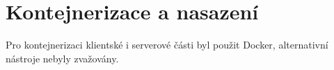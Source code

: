 \chapter{Kontejnerizace a nasazení}\label{ch:deployment}

Pro kontejnerizaci klientské i serverové části byl použit Docker, alternativní nástroje nebyly zvažovány.
